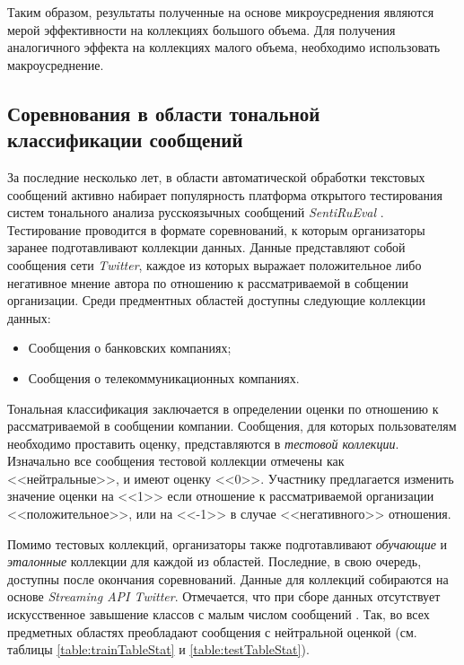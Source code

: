     Таким образом, результаты полученные на основе микроусреднения являются мерой
    эффективности на коллекциях большого объема. Для получения аналогичного эффекта
    на коллекциях малого объема, необходимо использовать макроусреднение. \cite{microMacroMeasuresDifferences}

    \subsection{Соревнования в области тональной классификации сообщений}
    За последние несколько лет, в области автоматической обработки текстовых сообщений
    активно набирает популярность платформа открытого тестирования систем
    тонального анализа русскоязычных сообщений {\it SentiRuEval} \cite{tonalityAnalisys}.
    Тестирование проводится в формате соревнований, к которым организаторы заранее подготавливают
    коллекции данных. Данные представляют собой сообщения сети {\it Twitter}, каждое из которых
    выражает положительное либо негативное мнение автора по отношению к рассматриваемой
    в собщении организации. Среди предментных областей доступны следующие коллекции
    данных:
    \begin{itemize}
        \item Сообщения о банковских компаниях;
        \item Сообщения о телекоммуникационных компаниях.
    \end{itemize}

    Тональная классификация заключается в определении оценки по отношению к
    рассматриваемой в сообщении компании. Сообщения, для которых пользователям
    необходимо проставить оценку, представляются в {\it тестовой коллекции}. Изначально все
    сообщения тестовой коллекции отмечены как <<нейтральные>>, и имеют оценку <<0>>.
    Участнику предлагается изменить значение оценки на <<1>> если отношение к
    рассматриваемой организации <<положительное>>, или на <<-1>> в случае
    <<негативного>> отношения.


    Помимо тестовых коллекций, организаторы также подготавливают {\it обучающие} и
    {\it эталонные} коллекции для каждой из областей. Последние, в свою очередь,
    доступны после окончания соревнований. Данные для коллекций собираются на
    основе {\it Streaming API Twitter}. Отмечается, что при сборе данных отсутствует
    искусственное завышение классов с малым числом сообщений \cite{tonalityAnalisys}.
    Так, во всех предметных областях преобладают сообщения с нейтральной оценкой (см. таблицы
    \ref{table:trainTableStat} и \ref{table:testTableStat}).


